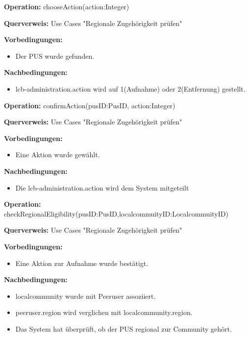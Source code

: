 \documentclass[a4paper,12pt]{article}
\begin{document}
	\begin{contractbox}
		\textbf{Operation:} chooseAction(action:Integer)
		
		\textbf{Querverweis:} Use Cases "Regionale Zugehörigkeit prüfen"
		
		\textbf{Vorbedingungen:}
		\begin{itemize}[noitemsep]
			\item Der PUS wurde gefunden.
		\end{itemize}
		
		\textbf{Nachbedingungen:}
		\begin{itemize}[noitemsep]
			\item lcb-administration.action wird auf 1(Aufnahme) oder 2(Entfernung) gestellt.
		\end{itemize}
	\end{contractbox}
	
	\begin{contractbox}
		\textbf{Operation:} confirmAction(pusID:PusID, action:Integer)
		
		\textbf{Querverweis:} Use Cases "Regionale Zugehörigkeit prüfen"
		
		\textbf{Vorbedingungen:}
		\begin{itemize}[noitemsep]
			\item Eine Aktion wurde gewählt.
		\end{itemize}
		
		\textbf{Nachbedingungen:}
		\begin{itemize}[noitemsep]
			\item Die lcb-administration.action wird dem System mitgeteilt
		\end{itemize}
	\end{contractbox}
	
	\begin{contractbox}
		\textbf{Operation:} checkRegionalEligibility(pusID:PusID,localcommuityID:LocalcommuityID)
		
		\textbf{Querverweis:} Use Cases "Regionale Zugehörigkeit prüfen"
		
		\textbf{Vorbedingungen:}
		\begin{itemize}[noitemsep]
			\item Eine Aktion zur Aufnahme wurde bestätigt.
		\end{itemize}
		
		\textbf{Nachbedingungen:}
		\begin{itemize}[noitemsep]
			\item localcommunity wurde mit Peeruser assoziiert. 
			\item peeruser.region wird verglichen mit localcommunity.region.
			\item Das System hat überprüft, ob der PUS regional zur Community gehört.
		\end{itemize}
	\end{contractbox}
	
\end{document}
